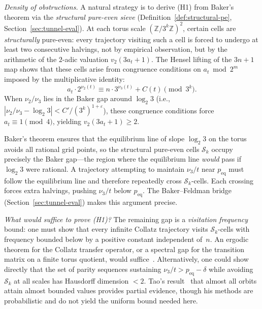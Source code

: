 \documentclass[manuscript]{aomart}
\newcommand{\Z}{\mathbb{Z}}
\theoremstyle{plain}
\theoremstyle{definition}
\theoremstyle{remark}
\numberwithin{equation}{section}
\begin{document}
\smallskip
\noindent
\emph{Density of obstructions.}
A natural strategy is to derive (H1) from Baker's theorem via the
\emph{structural pure-even sieve} (Definition~\ref{def:structural-pe},
Section~\ref{sec:tunnel-eval}).  At each torus scale $(\Z/3^k\Z)^2$,
certain cells are \emph{structurally} pure-even: every trajectory
visiting such a cell is forced to undergo at least two consecutive
halvings, not by empirical observation, but by the arithmetic of the
$2$-adic valuation $v_2(3a_t + 1)$.  The Hensel lifting of the
$3n+1$ map shows that these cells arise from congruence conditions
on $a_t \bmod 2^m$ imposed by the multiplicative identity:
\begin{equation}\label{eq:obstruction}
  a_t \cdot 2^{\nu_2(t)} \equiv n \cdot 3^{\nu_3(t)} + C(t) \pmod{3^k}.
\end{equation}
When $\nu_2/\nu_3$ lies in the Baker gap around $\log_2 3$
(i.e., $|\nu_2/\nu_3 - \log_2 3| < C'/(3^k)^{1+\varepsilon}$),
these congruence conditions force $a_t \equiv 1 \pmod{4}$, yielding
$v_2(3a_t + 1) \ge 2$.

Baker's theorem ensures that the equilibrium line of slope $\log_2 3$
on the torus avoids all rational grid points, so the structural
pure-even cells $\mathcal{S}_k$ occupy precisely the Baker gap---the
region where the equilibrium line \emph{would} pass if $\log_2 3$
were rational.  A trajectory attempting to maintain $\nu_3/t$ near
$p_{\mathrm{eq}}$ must follow the equilibrium line and therefore
repeatedly cross $\mathcal{S}_k$-cells.  Each crossing forces extra
halvings, pushing $\nu_3/t$ below $p_{\mathrm{eq}}$.  The
Baker--Feldman bridge (Section~\ref{sec:tunnel-eval}) makes this
argument precise.

\smallskip
\noindent
\emph{What would suffice to prove (H1)?}
The remaining gap is a \emph{visitation frequency} bound: one must
show that every infinite Collatz trajectory visits $\mathcal{S}_k$-cells
with frequency bounded below by a positive constant independent
of~$n$.  An ergodic theorem for the Collatz transfer operator, or
a spectral gap for the transition matrix on a finite torus quotient,
would suffice~\cite{Wirsching1998}.  Alternatively, one could show
directly that the set of parity sequences sustaining
$\nu_3/t > p_{\mathrm{eq}} - \delta$ while avoiding $\mathcal{S}_k$
at all scales has Hausdorff dimension $< 2$.  Tao's
result~\cite{Tao2022} that almost all orbits attain almost bounded
values provides partial evidence, though his methods are
probabilistic and do not yield the uniform bound needed here.
\end{document}
